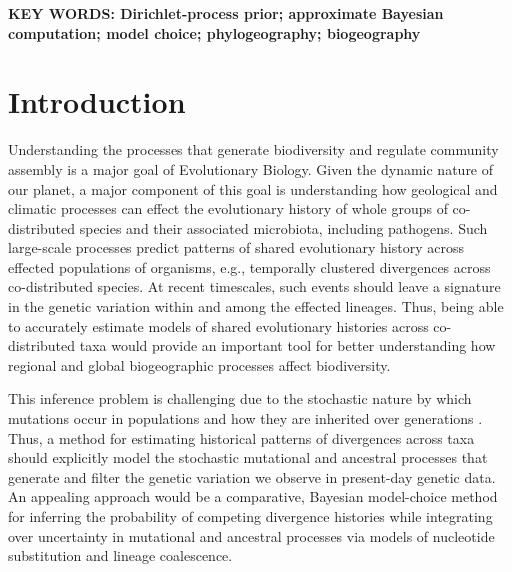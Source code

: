 \documentclass[letterpaper,12pt]{article}
\begin{document}
\begin{linenumbers}
{    \vspace{12pt}
    \noindent\textbf{KEY WORDS: Dirichlet-process prior; approximate Bayesian
    computation; model choice; phylogeography; biogeography} 
}

\newpage

\section*{Introduction}
Understanding the processes that generate biodiversity and regulate
community assembly is a major goal of Evolutionary Biology.
Given the dynamic nature of our planet, a major component of this goal is
understanding how geological and climatic processes can effect the
evolutionary history of whole groups of co-distributed species and their
associated microbiota, including pathogens.
Such large-scale processes predict patterns of shared evolutionary history
across effected populations of organisms, e.g., temporally clustered
divergences across co-distributed species.
At recent timescales, such events should leave a signature in the genetic
variation within and among the effected lineages.
Thus, being able to accurately estimate models of shared evolutionary
histories across co-distributed taxa would provide an important
tool for better understanding how regional and global biogeographic
processes affect biodiversity.

This inference problem is challenging due to the stochastic nature by which
mutations occur in populations and how they are inherited over generations
\citep{Hudson1990,WakeleyCoalescent}.
Thus, a method for estimating historical patterns of divergences across taxa
should explicitly model the stochastic mutational and ancestral processes that
generate and filter the genetic variation we observe in present-day genetic
data.
An appealing approach would be a comparative, Bayesian model-choice method for
inferring the probability of competing divergence histories while integrating
over uncertainty in mutational and ancestral processes via models of nucleotide
substitution and lineage coalescence.


\end{linenumbers}
\end{document}
